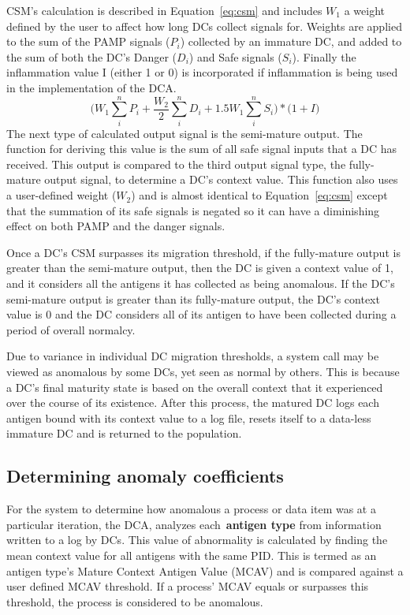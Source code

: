 \documentclass{umm-senior-sem}
\begin{document}
CSM's calculation is described in Equation~\ref{eq:csm} and includes $W_{1}$ a weight defined by the user to affect how long DCs collect signals for. Weights are applied to the sum of the PAMP signals ($P_i$) collected by an immature DC, and added to the sum of both the DC's Danger ($D_i$) and Safe signals ($S_i$). Finally the inflammation value I (either 1 or 0) is incorporated if inflammation is being used in the implementation of the DCA.
\begin{equation}
\label{eq:csm}
\big(W_{1}\sum_i^n  P_{i} + \frac{W_{2}}{2}\sum_i^n  D_{i} + 1.5W_{1}\sum_i^n  S_{i}\big)* \big(1+I\big) 
\end{equation}
The next type of calculated output signal is the semi-mature output. The function for deriving this value is the sum of all safe signal inputs that a DC has received. This output is compared to the third output signal type, the fully-mature output signal, to determine a DC's context value. This function also uses a user-defined weight ($W_{2}$) and is almost identical to Equation~\ref{eq:csm} except that the summation of its safe signals is negated so it can have a diminishing effect on both PAMP and the danger signals. 

Once a DC's CSM surpasses its migration threshold, if the fully-mature output is greater than the semi-mature output, then the DC is given a context value of 1, and it considers all the antigens it has collected as being anomalous. If the DC's semi-mature output is greater than its fully-mature output, the DC's context value is 0 and the DC considers all of its antigen to have been collected during a period of overall normalcy.

Due to variance in individual DC migration thresholds, a system call may be viewed as anomalous by some DCs, yet seen as normal by others. This is because a DC's final maturity state is based on the overall context that it experienced over the course of its existence. 
After this process, the matured DC logs each antigen bound with its context value to a log file, resets itself to a data-less immature DC and is returned to the population.

\subsection{Determining anomaly coefficients}
\label{sec:anomalyCoefficient}
For the system to determine how anomalous a process or data item was at a particular iteration, the DCA, analyzes each~\textbf{antigen type} from information written to a log by DCs. This value of abnormality is calculated by finding the mean context value for all antigens with the same PID. This is termed as an antigen type's Mature Context Antigen Value (MCAV) and is compared against a user defined MCAV threshold. If a process' MCAV equals or surpasses this threshold, the process is considered to be anomalous.
\end{document}
